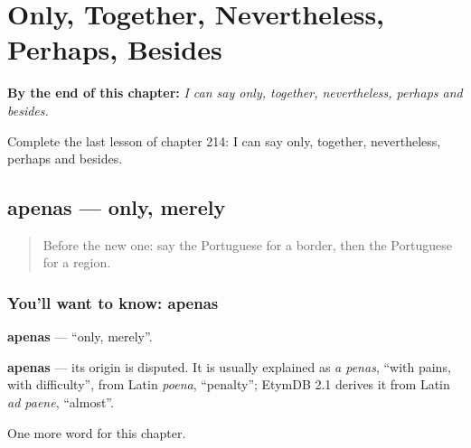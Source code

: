 
\chapter{Only, Together, Nevertheless, Perhaps, Besides}
\label{ch:pt-only-together-nevertheless-perhaps-besides}

\begin{chapteropening}
\textbf{By the end of this chapter:} \emph{I can say only, together, nevertheless, perhaps and besides.}

Complete the last lesson of chapter 214: I can say only, together, nevertheless, perhaps and besides.
\end{chapteropening}

\section[apenas]{apenas — only, merely}

\label{lesson:PT-C214-apenas}



\begin{quote}
Before the new one: say the Portuguese for a border, then the Portuguese for a region.
\end{quote}

\subsection*{You'll want to know: apenas}
\textbf{apenas} — \textquotedblleft{}only, merely\textquotedblright{}.

\begin{cousinweb}
\textbf{apenas} — its origin is disputed. It is usually explained as \emph{a penas}, \textquotedblleft{}with pains, with difficulty\textquotedblright{}, from Latin \emph{poena}, \textquotedblleft{}penalty\textquotedblright{}; EtymDB 2.1 derives it from Latin \emph{ad paene}, \textquotedblleft{}almost\textquotedblright{}.
\end{cousinweb}

\begin{grammarlens}[title={What you've built}]
One more word for this chapter.
\end{grammarlens}


